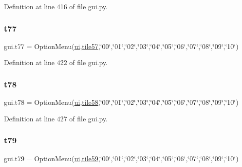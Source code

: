 Definition at line 416 of file gui.\+py.

\mbox{\label{namespacegui_a7dbb7da7abe6b97bf52c722f728e1ab5}} 
\subsubsection{\texorpdfstring{t77}{t77}}
{\footnotesize\ttfamily gui.\+t77 = Option\+Menu(\mbox{\hyperlink{namespacegui_a40ab7281456eadbea2dc2038f5c24fa1}{ui}},\mbox{\hyperlink{namespacegui_aa3077c3a423a682ff87cf7a59a096a1a}{tile57}},\char`\"{}00\char`\"{},\char`\"{}01\char`\"{},\char`\"{}02\char`\"{},\char`\"{}03\char`\"{},\char`\"{}04\char`\"{},\char`\"{}05\char`\"{},\char`\"{}06\char`\"{},\char`\"{}07\char`\"{},\char`\"{}08\char`\"{},\char`\"{}09\char`\"{},\char`\"{}10\char`\"{})}



Definition at line 422 of file gui.\+py.

\mbox{\label{namespacegui_a8e05d3dfa6cee82c82d4eec30d56f773}} 
\subsubsection{\texorpdfstring{t78}{t78}}
{\footnotesize\ttfamily gui.\+t78 = Option\+Menu(\mbox{\hyperlink{namespacegui_a40ab7281456eadbea2dc2038f5c24fa1}{ui}},\mbox{\hyperlink{namespacegui_a99c90d661722beb1c379e2d9fc6169a4}{tile58}},\char`\"{}00\char`\"{},\char`\"{}01\char`\"{},\char`\"{}02\char`\"{},\char`\"{}03\char`\"{},\char`\"{}04\char`\"{},\char`\"{}05\char`\"{},\char`\"{}06\char`\"{},\char`\"{}07\char`\"{},\char`\"{}08\char`\"{},\char`\"{}09\char`\"{},\char`\"{}10\char`\"{})}



Definition at line 427 of file gui.\+py.

\mbox{\label{namespacegui_a4f1d22993ba837606a10c17e13be7f78}} 
\subsubsection{\texorpdfstring{t79}{t79}}
{\footnotesize\ttfamily gui.\+t79 = Option\+Menu(\mbox{\hyperlink{namespacegui_a40ab7281456eadbea2dc2038f5c24fa1}{ui}},\mbox{\hyperlink{namespacegui_a841a445f892ff85a173e8562fe380797}{tile59}},\char`\"{}00\char`\"{},\char`\"{}01\char`\"{},\char`\"{}02\char`\"{},\char`\"{}03\char`\"{},\char`\"{}04\char`\"{},\char`\"{}05\char`\"{},\char`\"{}06\char`\"{},\char`\"{}07\char`\"{},\char`\"{}08\char`\"{},\char`\"{}09\char`\"{},\char`\"{}10\char`\"{})}



